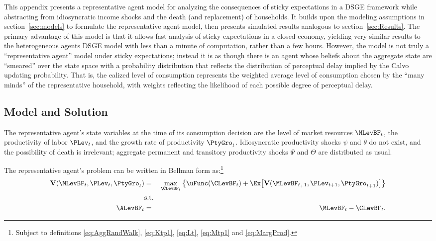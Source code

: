 
This appendix presents a representative agent model for analyzing the consequences of sticky expectations in a DSGE framework while abstracting from idiosyncratic income shocks and the death (and replacement) of households.  It builds upon the modeling assumptions in section~\ref{sec:models} to formulate the representative agent model, then presents simulated results analogous to section~\ref{sec:Results}.  The primary advantage of this model is that it allows fast analysis of sticky expectations in a closed economy, yielding very similar results to the heterogeneous agents DSGE model with less than a minute of computation, rather than a few hours.  However, the model is not truly a ``representative agent'' model under sticky expectations; instead it is as though there is an agent whose beliefs about the aggregate state are ``smeared'' over the state space with a probability distribution that reflects the distribution of perceptual delay implied by the Calvo updating probability. That is, the ealized level of consumption represents the weighted average level of consumption chosen by the ``many minds'' of the representative household, with weights reflecting the likelihood of each possible degree of perceptual delay.


\subsection{Model and Solution}

The representative agent's state variables at the time of its consumption decision are the
level of market resources $\MLevBF_t$, the productivity of labor $\PLev_t$, and the growth
rate of productivity $\PtyGro_t$.  Idiosyncratic productivity shocks $\psi$ and $\theta$ do
not exist, and the possibility of death is irrelevant; aggregate permanent and transitory
productivity shocks $\Psi$ and $\Theta$ are distributed as usual.

The representative agent's problem can be written in Bellman form as:\footnote{Subject to definitions \eqref{eq:AggRandWalk}, \eqref{eq:Ktp1}, \eqref{eq:Lt}, \eqref{eq:Mtp1} and \eqref{eq:MargProd}.}
\begin{eqnarray*}
\textbf{V}(\MLevBF_t,\PLev_t,\PtyGro_t) &=& \max_{\CLevBF_t} \big\{ \uFunc(\CLevBF_t) + \Ex \big[\textbf{V}(\MLevBF_{t_+1},\PLev_{t+1},\PtyGro_{t+1})\big]   \big\} \nonumber
\\  & \mbox{s.t.} & \nonumber
\\ \ALevBF_t &=& \MLevBF_t - \CLevBF_t. \nonumber
\end{eqnarray*}

